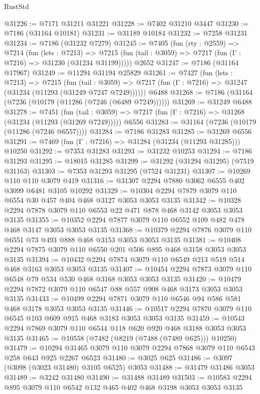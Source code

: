 \begin{lexlean}{RustStd}
\begin{coremodule}
{\begin{coremodule}
{{{{{{{{{{{{{{{{{{{{{{{{{{{{{{{{@31226 := @7171 @31211 @31221
@31228 := @7402 @31210 @3447
@31230 := @7186 (@31164 @10181)
@31231 := @31189 @10184
@31232 := @7258 @31231
@31234 := @7186 (@31232 @7279)
@31245 := @7405
    (fun (rty : @2559) =>
    @7214
      (fun (lets : @7213) =>
      @7215 (fun (tail : @3059) => @7217 (fun (Γ : @7216) => @31230 (@31234 @31199)))))
    @2652
@31247 := @7186 (@31164 @17967)
@31249 := @11294 @31194 @25829
@31261 := @7427
    (fun (lets : @7213) =>
    @7215
      (fun (tail : @3059) =>
      @7217 (fun (Γ : @7216) => @31247 (@31234 (@11293 (@31249 @7247 @7249))))))
    @6488
@31268 := @7186 (@31164 (@7236 (@10179 (@11286 (@7246 (@6489 @7249))))))
@31269 := @31249 @6488
@31278 := @7451
    (fun (tail : @3059) => @7217 (fun (Γ : @7216) => @31268 (@31234 (@11293 (@31269 @7249)))))
    @6556
@31283 := @31164 (@7236 (@10179 (@11286 (@7246 @6557))))
@31284 := @7186 @31283
@31285 := @31269 @6556
@31291 := @7469 (fun (Γ : @7216) => @31284 (@31234 (@11293 @31285))) @10250
@31292 := @7353 @31283
@31293 := @31232 @10253
@31294 := @7186 @31293
@31295 := @18015 @31285
@31299 := @31292 (@31294 @31295) (@7519 @31163)
@31303 := @7353 @31293 @31295 (@7524 @31231)
@31307 := @10269 @110 @110 @3079 @419
@31316 := @31307 @2294 @7880 @3062 @6555 @402 @3099 @6481 @3105 @10292
@31329 := @10304 @2294 @7879 @3079 @110 @6554 @30 @457 @404 @468 @3127 @3053 @3053 @3135
@31342 := @10328 @2294 @7878 @3079 @110 @6553 @22 @471 @878 @468 @3142 @3053 @3053 @3135
@31355 := @10352 @2294 @7877 @3079 @110 @6552 @109 @482 @478 @468 @3147 @3053 @3053 @3135
@31368 := @10379 @2294 @7876 @3079 @110 @6551 @73 @493 @888 @468 @3153 @3053 @3053 @3135
@31381 := @10408 @2294 @7875 @3079 @110 @6550 @201 @506 @895 @468 @3158 @3053 @3053 @3135
@31394 := @10432 @2294 @7874 @3079 @110 @6549 @213 @519 @514 @468 @3163 @3053 @3053 @3135
@31407 := @10454 @2294 @7873 @3079 @110 @6548 @79 @534 @530 @468 @3168 @3053 @3053 @3135
@31420 := @10479 @2294 @7872 @3079 @110 @6547 @88 @557 @908 @468 @3173 @3053 @3053 @3135
@31433 := @10499 @2294 @7871 @3079 @110 @6546 @94 @586 @581 @468 @3178 @3053 @3053 @3135
@31446 := @10517 @2294 @7870 @3079 @110 @6545 @103 @609 @915 @468 @3183 @3053 @3053 @3135
@31459 := @10543 @2294 @7869 @3079 @110 @6544 @118 @620 @920 @468 @3188 @3053 @3053 @3135
@31465 := @10558 (@7482 (@8219 (@7488 (@7489 @625))) @10250)
@31479 := @10294 @31465 @3079 @110 @3079 @2294 @7868 @3079 @110 @6543 @258 @643 @925 @2267 @6523
@31480 := @3025 @625
@31486 := @3097 (@3098 (@3023 @31480) @3105 @6525) @3053
@31488 := @31479 @31486 @3053
@31489 := @3242 @31480
@31490 := @31488 @31489
@31503 := @10583 @2294 @895 @3079 @110 @6542 @132 @465 @402 @468 @3198 @3053 @3053 @3135
}}}}}}}}}}}}}}}}}}}}}}}}}}}}}}}}
\end{coremodule}}
\end{coremodule}
\end{lexlean}
